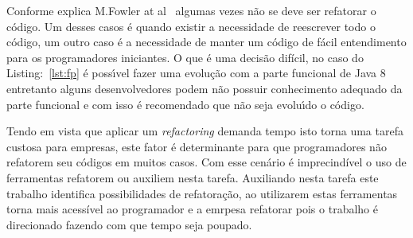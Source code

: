 Conforme explica M.Fowler at al~\cite{martinFowlerRafactoring} algumas vezes n\~{a}o se deve ser refatorar o c\'{o}digo. Um desses casos \'{e} quando existir a necessidade de reescrever todo o c\'{o}digo, um outro caso \'{e} a necessidade de manter um  c\'{o}digo de f\'{a}cil entendimento para os programadores iniciantes. O que \'{e} uma decis\~{a}o dif\'{i}cil, no caso do Listing:~\ref{lst:fp} \'{e} poss\'{\i}vel fazer uma evolu\c{c}\~{a}o com a parte funcional de Java 8 entretanto alguns desenvolvedores podem n\~{a}o possuir  conhecimento adequado da parte funcional e com isso \'{e} recomendado que n\~{a}o seja evolu\'{\i}do o c\'{o}digo.


Tendo em vista que aplicar um \textit{refactoring} demanda tempo isto torna uma tarefa custosa para empresas, este fator \'{e} determinante para que programadores n\~{a}o refatorem seu c\'{o}digos em muitos casos. Com esse cen\'{a}rio \'{e} imprecind\'{i}vel o uso de ferramentas refatorem ou auxiliem nesta tarefa. Auxiliando nesta tarefa este trabalho identifica possibilidades de refatora\c{c}\~{a}o, ao utilizarem estas ferramentas torna mais acessível ao programador e a emrpesa refatorar pois o trabalho é direcionado fazendo com que tempo seja poupado.


%
